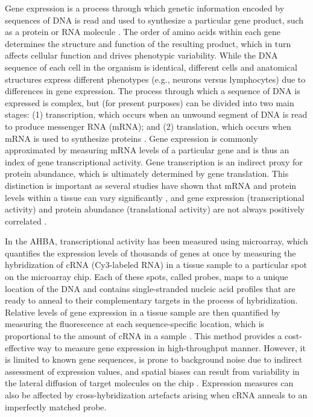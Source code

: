 \documentclass[10pt,A4]{article}
\begin{document}
Gene expression is a process through which genetic information encoded by sequences of DNA is read and used to synthesize a particular gene product, such as a protein or RNA molecule \citep{Szymanski2002}. The order of amino acids within each gene determines the structure and function of the resulting product, which in turn affects cellular function and drives phenotypic variability. While the DNA sequence of each cell in the organism is identical, different cells and anatomical structures express different phenotypes (e.g., neurons versus lymphocytes) due to differences in gene expression. The process through which a sequence of DNA is expressed is complex, but (for present purposes) can be divided into two main stages: (1) transcription, which occurs when an unwound segment of DNA is read to produce messenger RNA (mRNA); and (2) translation, which occurs when mRNA is used to synthesize proteins \citep{Krebs2014}. Gene expression is commonly approximated by measuring mRNA levels of a particular gene and is thus an index of gene transcriptional activity. Gene transcription is an indirect proxy for protein abundance, which is ultimately determined by gene translation. This distinction is important as several studies have shown that mRNA and protein levels within a tissue can vary significantly \citep{Futcher1999,Gygi1999,Greenbaum2003}, and gene expression (transcriptional activity) and protein abundance (translational activity) are not always positively correlated \citep{Margineantu2007,Schwanhausser2011}.

In the AHBA, transcriptional activity has been measured using microarray, which quantifies the expression levels of thousands of genes at once by measuring the hybridization of cRNA (Cy3-labeled RNA) in a tissue sample to a  particular spot on the microarray chip. Each of these spots, called probes, maps to a unique location of the DNA and contains single-stranded nucleic acid profiles that are ready to anneal to their complementary targets in the process of hybridization. Relative levels of gene expression in a tissue sample are then quantified by measuring the fluorescence at each sequence-specific location, which is proportional to the amount of cRNA in a sample \citep{Tarca2006}. This method provides a cost-effective way to measure gene expression in high-throughput manner. However, it is limited to known gene sequences, is prone to background noise due to indirect assessment of expression values, and spatial biases can result from variability in the lateral diffusion of target molecules on the chip \citep{Steger2011}. Expression measures can also be affected by cross-hybridization artefacts arising when cRNA anneals to an imperfectly matched probe.
\end{document}
